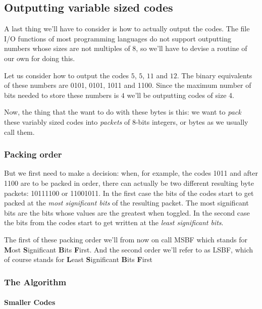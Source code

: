 \begin{refsection}
\subsection{Outputting variable sized codes}

A last thing we'll have to consider is how to actually output the
codes. The file I/O functions of most programming languages do not
support outputting numbers whose sizes are not multiples of 8, so
we'll have to devise a routine of our own for doing this.

Let us consider how to output the codes $5$, $5$, $11$ and $12$. The
binary equivalents of these numbers are 0101, 0101, 1011 and
1100. Since the maximum number of bits needed to store these numbers
is $4$ we'll be outputting codes of size 4.

Now, the thing that the want to do with these bytes is this: we want
to \textit{pack} these variably sized codes into
\textit{packets} of 8-bits integers, or bytes as we
usually call them.

\subsubsection{Packing order}

But we first need to make a decision: when, for example, the codes
1011 and after 1100 are to be packed in order, there can actually be two
different resulting byte packets: 10111100 or 11001011. In the first
case the bits of the codes start to get packed at the \textit{most
  significant bits} of the resulting packet.  The most significant
bits are the bits whose values are the greatest when toggled. In the
second case the bits from the codes start to get written at the
\textit{least significant bits}.

The first of these packing order we'll from now on call
MSBF which stands for \textbf{M}ost \textbf{S}ignificant
\textbf{B}its \textbf{F}irst. And the second order we'll refer to as
LSBF, which of course stands for \textbf{L}east
\textbf{S}ignificant \textbf{B}its \textbf{F}irst

\subsubsection{The Algorithm}

\paragraph{Smaller Codes}


\end{refsection}

